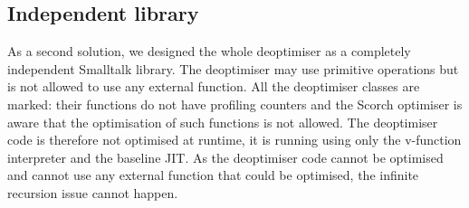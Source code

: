 \documentclass[a4paper,12pt,twoside]{../includes/ThesisStyle}
\begin{document}
\subsection{Independent library}
\label{sec:independentLib}

As a second solution, we designed the whole deoptimiser as a completely independent Smalltalk library. The deoptimiser may use primitive operations but is not allowed to use any external function. All the deoptimiser classes are marked: their functions do not have profiling counters and the Scorch optimiser is aware that the optimisation of such functions is not allowed. The deoptimiser code is therefore not optimised at runtime, it is running using only the v-function interpreter and the baseline JIT. As the deoptimiser code cannot be optimised and cannot use any external function that could be optimised, the infinite recursion issue cannot happen.
\end{document}
